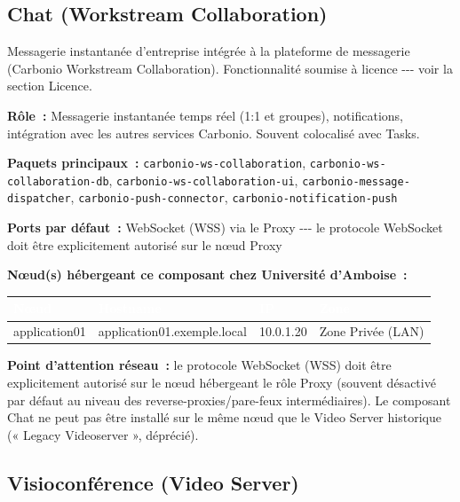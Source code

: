 \documentclass[11pt,a4paper]{report}
\newcommand{\tblhead}[1]{\textcolor{white}{\textbf{#1}}}
\begin{document}
\subsection{Chat (Workstream Collaboration)}

Messagerie instantanée d'entreprise intégrée à la plateforme de messagerie (Carbonio Workstream Collaboration).\allowbreak{} Fonctionnalité soumise à licence -\allowbreak{}-\allowbreak{}-\allowbreak{} voir la section Licence.\allowbreak{}

\textbf{Rôle~:} Messagerie instantanée temps réel (1:1 et groupes), notifications, intégration avec les autres services Carbonio.\allowbreak{} Souvent colocalisé avec Tasks.\allowbreak{}

\textbf{Paquets principaux~:} \texttt{carbonio-\allowbreak{}ws-\allowbreak{}collaboration}, \texttt{carbonio-\allowbreak{}ws-\allowbreak{}collaboration-\allowbreak{}db}, \texttt{carbonio-\allowbreak{}ws-\allowbreak{}collaboration-\allowbreak{}ui}, \texttt{carbonio-\allowbreak{}message-\allowbreak{}dispatcher}, \texttt{carbonio-\allowbreak{}push-\allowbreak{}connector}, \texttt{carbonio-\allowbreak{}notification-\allowbreak{}push}

\textbf{Ports par défaut~:} WebSocket (WSS) via le Proxy -\allowbreak{}-\allowbreak{}-\allowbreak{} le protocole WebSocket doit être explicitement autorisé sur le nœud Proxy

\textbf{Nœud(s) hébergeant ce composant chez Université d'Amboise~:}
\begin{longtable}{|p{3.2cm}|p{4.5cm}|p{3.2cm}|p{2.3cm}|}
\hline
\rowcolor{primary}\tblhead{Nœud} & \tblhead{Hostname} & \tblhead{IP} & \tblhead{Zone} \\
\hline
\endhead
application01 & application01.\allowbreak{}exemple.\allowbreak{}local & 10.\allowbreak{}0.\allowbreak{}1.\allowbreak{}20 & Zone Privée (LAN) \\
\hline
\end{longtable}

\textbf{Point d'attention réseau~:} le protocole WebSocket (WSS) doit être explicitement autorisé sur le nœud hébergeant le rôle Proxy (souvent désactivé par défaut au niveau des reverse-proxies/pare-feux intermédiaires). Le composant Chat ne peut pas être installé sur le même nœud que le Video Server historique (« Legacy Videoserver », déprécié).

\subsection{Visioconférence (Video Server)}
\end{document}
